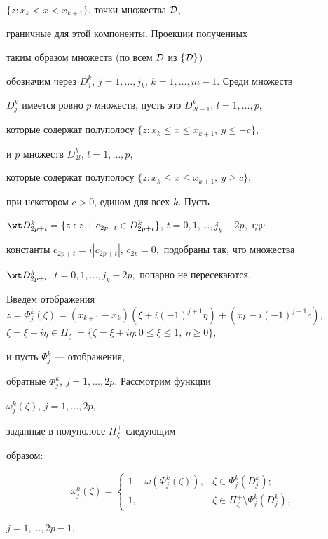 \begin{pf}
$\{z:x_k<x<x_{k+1}\}$, точки множества ${\cal D}$,


граничные для этой компоненты. Проекции полученных 


таким образом множеств (по всем ${\cal D}$ из $\{{\cal D}\}$)


обозначим через $D_j^k$, $j=1,\dotsc,j_k$, $k=1,\dotsc,m-1.$ Среди множеств


$D_j^k$ имеется ровно $p$ множеств, пусть это $D_{2l-1}^k$, $l=1,\dotsc,p$,


которые содержат полуполосу $\{z:x_k\leq x\leq x_{k+1},\ y\leq -c\},$


и $p$ множеств $D_{2l}^k$, $l=1,\dotsc,p$,


которые содержат полуполосу $\{z:x_k\leq x\leq x_{k+1},\ y\geq c\},$


при некотором $c>0$, едином для всех $k$. Пусть


$\wt D_{2p+t}^k=\{z:z+c_{2p+t}\in D_{2p+t}^k\}$, $t=0,1,\dotsc,j_k-2p,$ где


константы $c_{2p+t}=i|c_{2p+t}|$, $c_{2p}=0,$ подобраны так, что множества


$\wt D_{2p+t}^k$, $t=0,1,\dotsc,j_k-2p,$ попарно не пересекаются.


Введем отображения $z=\Phi_j^k(\zeta)=(x_{k+1}-x_k)(\xi+i(-1)^{j+1}\eta)+


(x_k-i(-1)^{j+1}c)$, $\zeta=\xi+i\eta\in \Pi^+_{\zeta}=


\{\zeta=\xi+i\eta:0\leq\xi\leq 1,\ \eta\geq 0\},$


и пусть $\Psi_j^k$ --- отображения,


обратные $\Phi_j^k$, $j=1,\dotsc,2p$. Рассмотрим функции


$\omega_j^k(\zeta)$, $j=1,\dotsc,2p$,


заданные в полуполосе $\Pi^+_{\zeta}$ следующим


образом:


$$


\omega_j^k(\zeta)=


\begin{cases}


1-\omega(\Phi_j^k(\zeta)), & \zeta\in \Psi_j^k(D_j^k);\\


1, & \zeta\in \Pi^+_{\zeta}\setminus\Psi_j^k(D_j^k),


\end{cases}


$$


$j=1,\dotsc,2p-1,$



\end{pf}
